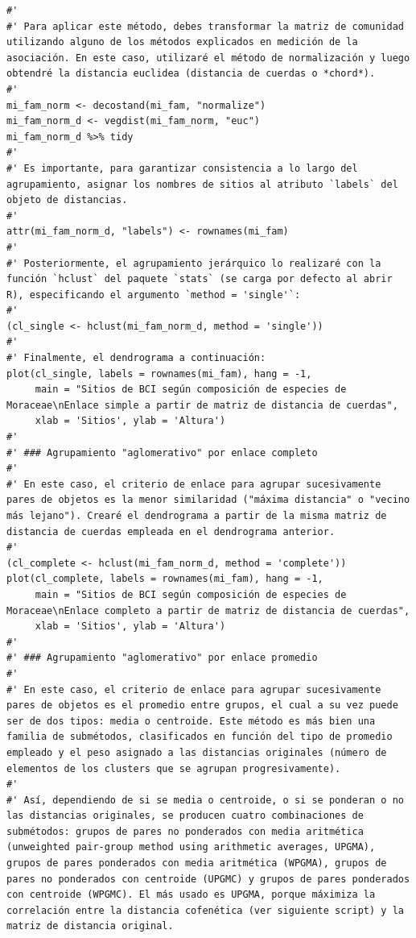 \documentclass[11pt,]{article}
\begin{document}
\begin{verbatim}
#' 
#' Para aplicar este método, debes transformar la matriz de comunidad utilizando alguno de los métodos explicados en medición de la asociación. En este caso, utilizaré el método de normalización y luego obtendré la distancia euclidea (distancia de cuerdas o *chord*).
#' 
mi_fam_norm <- decostand(mi_fam, "normalize")
mi_fam_norm_d <- vegdist(mi_fam_norm, "euc")
mi_fam_norm_d %>% tidy
#'
#' Es importante, para garantizar consistencia a lo largo del agrupamiento, asignar los nombres de sitios al atributo `labels` del objeto de distancias.
#' 
attr(mi_fam_norm_d, "labels") <- rownames(mi_fam)
#' 
#' Posteriormente, el agrupamiento jerárquico lo realizaré con la función `hclust` del paquete `stats` (se carga por defecto al abrir R), especificando el argumento `method = 'single'`:
#' 
(cl_single <- hclust(mi_fam_norm_d, method = 'single'))
#' 
#' Finalmente, el dendrograma a continuación:
plot(cl_single, labels = rownames(mi_fam), hang = -1,
     main = "Sitios de BCI según composición de especies de Moraceae\nEnlace simple a partir de matriz de distancia de cuerdas",
     xlab = 'Sitios', ylab = 'Altura')
#' 
#' ### Agrupamiento "aglomerativo" por enlace completo
#' 
#' En este caso, el criterio de enlace para agrupar sucesivamente pares de objetos es la menor similaridad ("máxima distancia" o "vecino más lejano"). Crearé el dendrograma a partir de la misma matriz de distancia de cuerdas empleada en el dendrograma anterior.
#' 
(cl_complete <- hclust(mi_fam_norm_d, method = 'complete'))
plot(cl_complete, labels = rownames(mi_fam), hang = -1,
     main = "Sitios de BCI según composición de especies de Moraceae\nEnlace completo a partir de matriz de distancia de cuerdas",
     xlab = 'Sitios', ylab = 'Altura')
#' 
#' ### Agrupamiento "aglomerativo" por enlace promedio
#' 
#' En este caso, el criterio de enlace para agrupar sucesivamente pares de objetos es el promedio entre grupos, el cual a su vez puede ser de dos tipos: media o centroide. Este método es más bien una familia de submétodos, clasificados en función del tipo de promedio empleado y el peso asignado a las distancias originales (número de elementos de los clusters que se agrupan progresivamente).
#' 
#' Así, dependiendo de si se media o centroide, o si se ponderan o no las distancias originales, se producen cuatro combinaciones de submétodos: grupos de pares no ponderados con media aritmética (unweighted pair-group method using arithmetic averages, UPGMA), grupos de pares ponderados con media aritmética (WPGMA), grupos de pares no ponderados con centroide (UPGMC) y grupos de pares ponderados con centroide (WPGMC). El más usado es UPGMA, porque máximiza la correlación entre la distancia cofenética (ver siguiente script) y la matriz de distancia original.

\end{verbatim}
\end{document}
